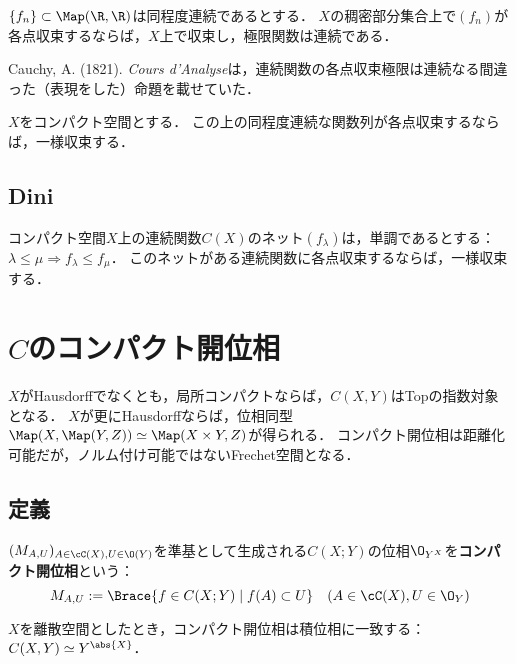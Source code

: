 \documentclass[uplatex,dvipdfmx]{jsreport}
\begin{document}
\begin{theorem}
    $\{f_n\}\subset\Map(\R,\R)$は同程度連続であるとする．
    $X$の稠密部分集合上で$(f_n)$が各点収束するならば，$X$上で収束し，極限関数は連続である．
\end{theorem}
\begin{history}
    Cauchy, A. (1821). \textit{Cours d'Analyse}は，連続関数の各点収束極限は連続なる間違った（表現をした）命題を載せていた．
\end{history}

\begin{proposition}
    $X$をコンパクト空間とする．
    この上の同程度連続な関数列が各点収束するならば，一様収束する．
\end{proposition}

\subsection{Dini}

\begin{lemma}
    コンパクト空間$X$上の連続関数$C(X)$のネット$(f_\lambda)$は，単調であるとする：$\lambda\le\mu\Rightarrow f_\lambda\le f_\mu$．
    このネットがある連続関数に各点収束するならば，一様収束する．
\end{lemma}

\section{$C$のコンパクト開位相}

\begin{tcolorbox}[colframe=ForestGreen, colback=ForestGreen!10!white,breakable,colbacktitle=ForestGreen!40!white,coltitle=black,fonttitle=\bfseries\sffamily,
title=]
    $X$がHausdorffでなくとも，局所コンパクトならば，$C(X,Y)$はTopの指数対象となる．
    $X$が更にHausdorffならば，位相同型$\Map(X,\Map(Y,Z))\simeq\Map(X\times Y,Z)$が得られる．
    コンパクト開位相は距離化可能だが，ノルム付け可能ではないFrechet空間となる．
\end{tcolorbox}

\subsection{定義}

\begin{definition}
    $(M_{A,U})_{A\in\cC(X),U\in\O(Y)}$を準基として生成される$C(X;Y)$の位相$\O_{Y^X}$を\textbf{コンパクト開位相}という：
    \[M_{A,U}:=\Brace{f\in C(X;Y)\mid f(A)\subset U}\quad(A\in\cC(X),U\in\O_Y)\]
\end{definition}
\begin{example}
    $X$を離散空間としたとき，コンパクト開位相は積位相に一致する：$C(X,Y)\simeq Y^{\abs{X}}$．
\end{example}
\end{document}
